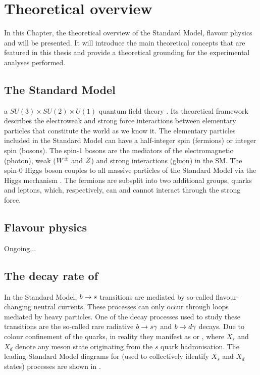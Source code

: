 \chapter{Theoretical overview}

In this Chapter, the theoretical overview of the Standard Model, flavour physics and \BtoXsgamma will be presented.
It will introduce the main theoretical concepts that are featured in this thesis and provide a theoretical grounding for the experimental analyses performed.

\section{The Standard Model}

a $SU(3)\times SU(2)\times U(1)$ quantum field theory \cite{Peskin:1995ev}.
Its theoretical framework describes the electroweak and strong force interactions between elementary particles that constitute the world as we know it.
The elementary particles included in the Standard Model can have a half-integer spin (fermions) or integer spin (bosons).
The spin-1 bosons are the mediators of the electromagnetic (photon), weak ($W^\pm$ and $Z$) and strong interactions (gluon) in the SM.
The spin-0 Higgs boson couples to all massive particles of the Standard Model via the Higgs mechanism \cite{PhysRevLett.13.508}.
The fermions are subsplit into two additional groups, quarks and leptons, which, respectively, can and cannot interact through the strong force.

\section{Flavour physics}

Ongoing...

\section{The decay rate of \texorpdfstring{\BtoXsdgamma}{B->Xsg}}\label{eq:btosgamma_theory}

In the Standard Model, $b\rightarrow s$ transitions are mediated by so-called flavour-changing neutral currents.
These processes can only occur through loops mediated by heavy particles.
One of the decay processes used to study these transitions are the so-called rare radiative $b\rightarrow s\gamma$ and $b\rightarrow d\gamma$ decays.
Due to colour confinement of the quarks, in reality they manifest as \BtoXsgamma or \BtoXdgamma, where $X_s$ and $X_d$ denote any meson state originating from the $s$ quark hadronisation.
The leading Standard Model diagrams for \BtoXsdgamma (used to collectively identify $X_s$ and $X_d$ states) processes are shown in .

